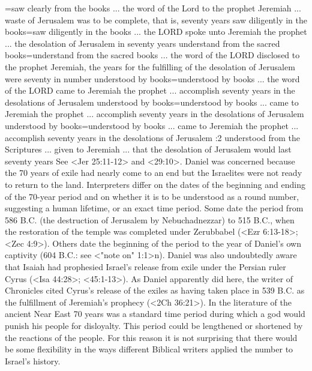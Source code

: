 ={saw clearly from the books ... the word of the Lord to the prophet Jeremiah ... waste of Jerusalem was to be complete, that is, seventy years} %
    {saw diligently in the books}={saw diligently in the books ... the LORD spoke unto Jeremiah the prophet ... the desolation of Jerusalem in seventy years} %
    {understand from the sacred books}={understand from the sacred books ... the word of the LORD disclosed to the prophet Jeremiah, the years for the fulfilling of the desolation of Jerusalem were seventy in number}  %
    {understood by books}={understood by books ... the word of the LORD came to Jeremiah the prophet ... accomplish seventy years in the desolations of Jerusalem}  %
    {understood by books}={understood by books ... came to Jeremiah the prophet  ... accomplish seventy years in the desolations of Jerusalem}  %
    {understood by books}={understood by books ... came to Jeremiah the prophet ... accomplish seventy years in the desolations of Jerusalem}  %
:2 {understood from the Scriptures ... given to Jeremiah ... that the desolation of Jerusalem would last seventy years} See <Jer 25:11-12> and <29:10>. Daniel was concerned because the 70 years of exile had nearly come to an end but the Israelites were not ready to return to the land. Interpreters differ on the dates of the beginning and ending of the 70-year period and on whether it is to be understood as a round number, suggesting a human lifetime,
or an exact time period. Some date the period from 586 B.C. (the destruction of Jerusalem by Nebuchadnezzar) to 515 B.C., when the  restoration of the temple was completed under Zerubbabel (<Ezr 6:13-18>; <Zec 4:9>). %
Others date the beginning of the period to the  year of Daniel's own captivity (604 B.C.: see <"note on" 1:1>n). Daniel was 
also undoubtedly aware that Isaiah had prophesied Israel's release 
from exile under the Persian ruler Cyrus (<Isa 44:28>; <45:1-13>). As Daniel apparently did here, the writer of Chronicles cited Cyrus's release of the exiles as having taken place in 539 B.C. as the fulfillment  of Jeremiah's prophecy (<2Ch 36:21>). In the literature of the ancient Near East 70 years was a standard time period during which a god would punish his people for disloyalty. This period could be lengthened or shortened by the reactions of the people. For this reason it is not surprising that there would be some flexibility in the ways different Biblical writers applied the number to Israel's history.

